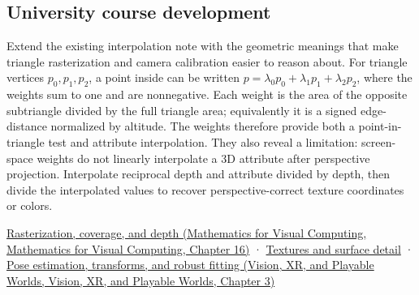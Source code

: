 \subsection{University course development}\label{appendix-02b9d9a81dca-university-course-development}

Extend the existing interpolation note with the geometric meanings that make triangle rasterization and camera calibration easier to reason about. For triangle vertices \(p_0,p_1,p_2\), a point inside can be written \(p=\lambda_0p_0+\lambda_1p_1+\lambda_2p_2\), where the weights sum to one and are nonnegative. Each weight is the area of the opposite subtriangle divided by the full triangle area; equivalently it is a signed edge-distance normalized by altitude. The weights therefore provide both a point-in-triangle test and attribute interpolation. They also reveal a limitation: screen-space weights do not linearly interpolate a 3D attribute after perspective projection. Interpolate reciprocal depth and attribute divided by depth, then divide the interpolated values to recover perspective-correct texture coordinates or colors.

\href{../02-Mathematics-for-Visual-Computing/main.pdf\#nameddest=03-visual-computing-i-ch012-rasterization-coverage-and-depth}{Rasterization, coverage, and depth (Mathematics for Visual Computing, Mathematics for Visual Computing, Chapter 16)} · \hyperref[03-visual-computing-i-ch019-textures-and-surface-detail]{Textures and surface detail} · \href{../07-Vision-XR-and-Playable-Worlds/main.pdf\#nameddest=04-visual-computing-ii-ch032-pose-estimation-transforms-and-robust-fitting}{Pose estimation, transforms, and robust fitting (Vision, XR, and Playable Worlds, Vision, XR, and Playable Worlds, Chapter 3)}
